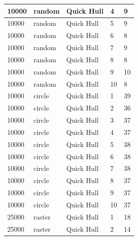 \documentclass[12pt]{article}
\begin{document}
\begin{longtable}{|l|l|l|l|l|}
10000        & random            & Quick Hull & 4          & 9                             \\ \hline
10000        & random            & Quick Hull & 5          & 9                             \\ \hline
10000        & random            & Quick Hull & 6          & 8                             \\ \hline
10000        & random            & Quick Hull & 7          & 9                             \\ \hline
10000        & random            & Quick Hull & 8          & 8                             \\ \hline
10000        & random            & Quick Hull & 9          & 10                            \\ \hline
10000        & random            & Quick Hull & 10         & 8                             \\ \hline
10000        & circle            & Quick Hull & 1          & 39                            \\ \hline
10000        & circle            & Quick Hull & 2          & 36                            \\ \hline
10000        & circle            & Quick Hull & 3          & 37                            \\ \hline
10000        & circle            & Quick Hull & 4          & 37                            \\ \hline
10000        & circle            & Quick Hull & 5          & 38                            \\ \hline
10000        & circle            & Quick Hull & 6          & 38                            \\ \hline
10000        & circle            & Quick Hull & 7          & 38                            \\ \hline
10000        & circle            & Quick Hull & 8          & 37                            \\ \hline
10000        & circle            & Quick Hull & 9          & 37                            \\ \hline
10000        & circle            & Quick Hull & 10         & 37                            \\ \hline
25000        & raster            & Quick Hull & 1          & 18                            \\ \hline
25000        & raster            & Quick Hull & 2          & 14                            \\ \hline

\end{longtable}
\end{document}
